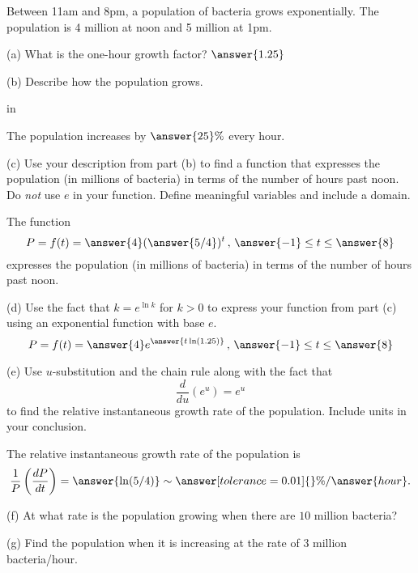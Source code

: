\documentclass{ximera}
\newcommand{\pskip}{\vskip 0.1 in}
\begin{document}
\begin{question}  \label{Qe545tgbvb}
Between 11am and 8pm, a population of bacteria grows exponentially. The population is 4 million at noon and 5 million at 1pm.

(a) What is the one-hour growth factor?  $\answer{1.25}$

(b) Describe how the population grows. 

\pskip

The population increases by $\answer{25}\%$ every hour.

(c) Use your description from part (b) to find a function that expresses the population (in millions of bacteria) in terms of the number of hours past noon. Do \emph{not} use $e$ in your function. Define meaningful variables and include a domain.

The function 
\[
  P= f(t) = \answer{4}(\answer{5/4})^t \, , \, \answer{-1} \leq t \leq \answer{8}
\]
expresses the population (in millions of bacteria) in terms of the number of hours past noon.


(d) Use the fact that $k = e^{\ln k}$ for $k>0$ to express your function from part (c) using an exponential function with base $e$.
\[
      P= f(t) = \answer{4}e^{\answer{t \ln(1.25)}} \, , \, \answer{-1} \leq t \leq \answer{8}
\]


(e) Use $u$-substitution and the chain rule along with the fact that 
\[
     \frac{d}{du}(e^{u}) = e^{u}
\]
to find the relative instantaneous growth rate of the population. Include units in your conclusion.

The relative instantaneous growth rate of the population is 
\[
      \frac{1}{P}\left(  \frac{dP}{dt}  \right) = \answer{\ln(5/4)} \sim \answer[tolerance=0.01]{}\%/\answer{hour} .
\]


(f) At what rate is the population growing when there are $10$ million bacteria?

(g) Find the population when it is increasing at the rate of $3$ million bacteria/hour.

\end{question}
\end{document}
